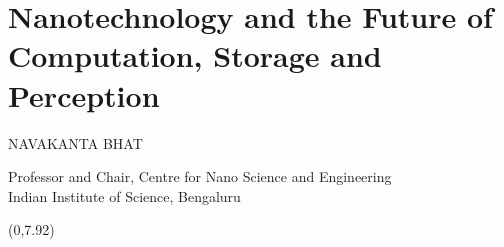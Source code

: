 \chapter{Nanotechnology and the Future of Computation, Storage and Perception}

\begin{center}
{\large\uppercase{Navakanta Bhat}}

\vskip -6pt

Professor and Chair, Centre for Nano Science and Engineering\\ Indian Institute of Science, Bengaluru
\end{center}

\vskip 1cm


\begin{textblock}{16}(0,7.92)
\noindent{}
\end{textblock}

\newpage

